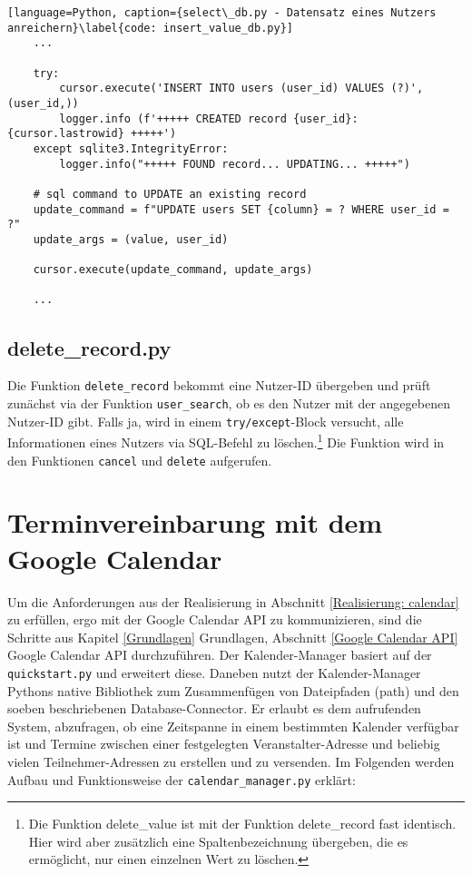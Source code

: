             \begin{lstlisting}[language=Python, caption={select\_db.py - Datensatz eines Nutzers anreichern}\label{code: insert_value_db.py}]
    ...

    try:
        cursor.execute('INSERT INTO users (user_id) VALUES (?)', (user_id,))
        logger.info (f'+++++ CREATED record {user_id}: {cursor.lastrowid} +++++')
    except sqlite3.IntegrityError:
        logger.info("+++++ FOUND record... UPDATING... +++++")

    # sql command to UPDATE an existing record
    update_command = f"UPDATE users SET {column} = ? WHERE user_id = ?"
    update_args = (value, user_id)

    cursor.execute(update_command, update_args)

    ...

            \end{lstlisting}
        
        \subsection{delete\_record.py} \label{Implementierung: delete_record.py}
            Die Funktion \verb|delete_record| bekommt eine Nutzer-ID übergeben und prüft zunächst via der Funktion \verb|user_search|, ob es den Nutzer mit der angegebenen Nutzer-ID gibt. Falls ja, wird in einem \verb|try/except|-Block versucht, alle Informationen eines Nutzers via SQL-Befehl zu löschen.\footnote{Die Funktion delete\_value ist mit der Funktion delete\_record fast identisch. Hier wird aber zusätzlich eine Spaltenbezeichnung übergeben, die es ermöglicht, nur einen einzelnen Wert zu löschen.} Die Funktion wird in den Funktionen \verb|cancel| und \verb|delete| aufgerufen.











    \section{Terminvereinbarung mit dem Google Calendar} \label{Implementierung: Kalender} 
        
        \label{Implementierung: calendar_manager.py}
        Um die Anforderungen aus der Realisierung in Abschnitt \ref*{Realisierung: calendar} zu erfüllen, ergo mit der Google Calendar API zu kommunizieren, sind die Schritte aus Kapitel \ref*{Grundlagen} Grundlagen, Abschnitt \ref*{Google Calendar API} Google Calendar API durchzuführen. Der Kalender-Manager basiert auf der \verb|quickstart.py| und erweitert diese. Daneben nutzt der Kalender-Manager Pythons native Bibliothek zum Zusammenfügen von Dateipfaden (path) und den soeben beschriebenen Database-Connector. Er erlaubt es dem aufrufenden System, abzufragen, ob eine Zeitspanne in einem bestimmten Kalender verfügbar ist und Termine zwischen einer festgelegten Veranstalter-Adresse und beliebig vielen Teilnehmer-Adressen zu erstellen und zu versenden. Im Folgenden werden Aufbau und Funktionsweise der \verb|calendar_manager.py| erklärt:

